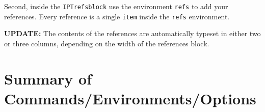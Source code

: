 Second, inside the \texttt{IPTrefsblock} use the environment \texttt{refs} to add your references. Every reference is a single \texttt{\bs{}item} inside the \texttt{refs} environment. 

\textbf{UPDATE:} The contents of the references are automatically typeset in either two or three columns, depending on the width of the references block.






\section{Summary of Commands/Environments/Options}

